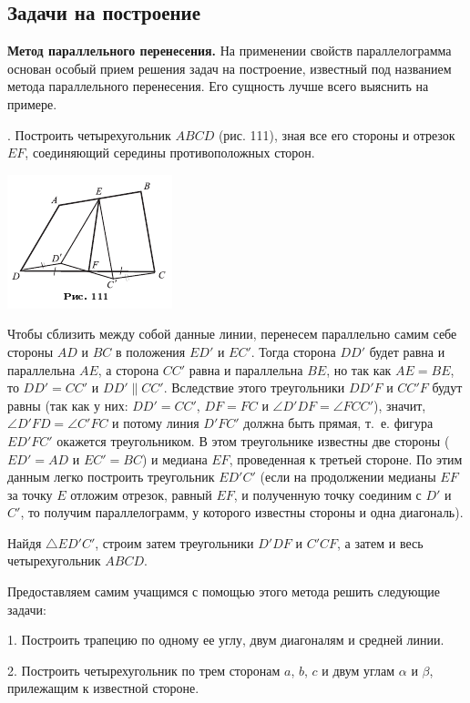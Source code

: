 \documentclass[oneside]{book}
\begin{document}
\subsection*{Задачи на построение}

\textbf{Метод параллельного перенесения.}
На применении свойств параллелограмма основан особый прием решения задач на построение, известный под названием метода параллельного перенесения.
Его сущность лучше всего выяснить на примере.

.
Построить четырехугольник $ABCD$ (рис. 111), зная все его стороны и отрезок $EF$, соединяющий середины противоположных сторон.

\includegraphics{pics/ris-111}

Чтобы сблизить между собой данные линии, перенесем параллельно самим себе стороны $AD$ и $BC$ в положения $ED'$ и $EC'$.
Тогда сторона $DD'$ будет равна и параллельна $AE$, а сторона $CC'$ равна и параллельна $BE$, но так как $AE=BE$, то $DD'=CC'$ и $DD'\parallel CC'$.
Вследствие этого треугольники $DD'F$ и $CC'F$ будут равны (так как у них:
$DD' = CC'$, $DF=FC$ и $\angle D'DF=\angle FCC'$), значит, $\angle D'FD=\angle C'FC$ и потому линия $D'FC'$ должна быть прямая, т.~е.
фигура $ED'FC'$ окажется треугольником.
В этом треугольнике известны две стороны ($ED'=AD$ и $EC'=BC$) и медиана $EF$, проведенная к третьей стороне.
По этим данным легко построить треугольник $ED'C'$ (если на продолжении медианы $EF$ за точку $E$ отложим отрезок, равный $EF$, и полученную точку соединим с $D'$ и $C'$, то получим параллелограмм, у которого известны стороны и одна диагональ).

Найдя $\triangle ED'C'$, строим затем треугольники $D'DF$ и $C'CF$, а затем и весь четырехугольник $ABCD$.

Предоставляем самим учащимся с помощью этого метода решить следующие задачи:

\medskip

1.
Построить трапецию по одному ее углу, двум диагоналям и средней линии.

2.
Построить четырехугольник по трем сторонам $a$, $b$, $c$ и двум углам $\alpha$ и $\beta$, прилежащим к известной стороне.
\end{document}
